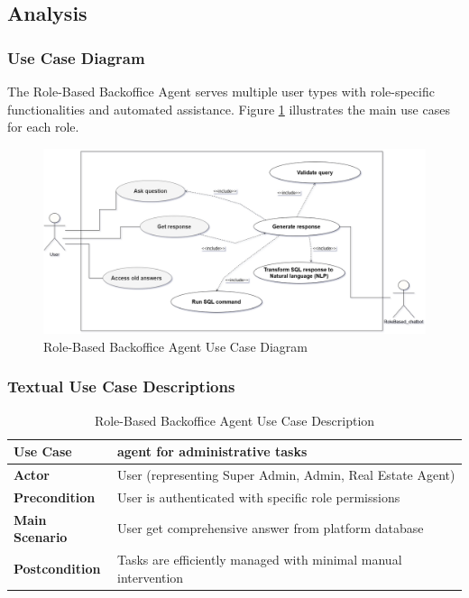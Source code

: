\subsection{Analysis}
\subsubsection{Use Case Diagram}
The Role-Based Backoffice Agent serves multiple user types with role-specific functionalities and automated assistance. Figure \ref{fig:backoffice-use-case} illustrates the main use cases for each role.

\begin{figure}[htbp]
    \centering
    \includegraphics[width=1\textwidth]{images/backoffice_use_case_diagram.png}
    \caption{Role-Based Backoffice Agent Use Case Diagram}
    \label{fig:backoffice-use-case}
\end{figure}

\subsubsection{Textual Use Case Descriptions}

\begin{table}[htbp]
    \centering
    \begin{tabular}{|p{3cm}|p{10cm}|}
        \hline
        \textbf{Use Case} & \textbf{agent for administrative tasks} \\
        \hline
        \textbf{Actor} & User (representing Super Admin, Admin, Real Estate Agent) \\
        \hline
        \textbf{Precondition} & User is authenticated with specific role permissions \\
        \hline
        \textbf{Main Scenario} & User get comprehensive answer from platform database \\
        \hline
        \textbf{Postcondition} & Tasks are efficiently managed with minimal manual intervention \\
        \hline
    \end{tabular}
    \caption{Role-Based Backoffice Agent Use Case Description}
    \label{tab:backoffice-use-case}
\end{table}

